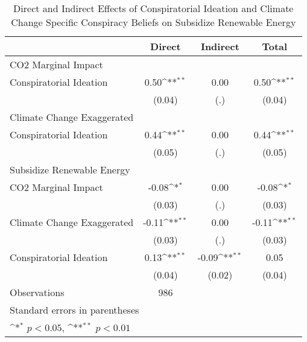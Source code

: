 \begin{table}[htbp]\centering
\def\sym#1{\ifmmode^{#1}\else\(^{#1}\)\fi}
\caption{Direct and Indirect Effects of Conspiratorial Ideation and Climate Change Specific Conspiracy Beliefs on Subsidize Renewable Energy}
\begin{tabular}{l*{3}{c}}
\hline\hline
                    &\multicolumn{1}{c}{Direct}&\multicolumn{1}{c}{Indirect}&\multicolumn{1}{c}{Total}\\
\hline
CO2 Marginal Impact &                    &                    &                    \\
Conspiratorial Ideation&        0.50\sym{**}&        0.00        &        0.50\sym{**}\\
                    &      (0.04)        &         (.)        &      (0.04)        \\
\hline
Climate Change Exaggerated&                    &                    &                    \\
Conspiratorial Ideation&        0.44\sym{**}&        0.00        &        0.44\sym{**}\\
                    &      (0.05)        &         (.)        &      (0.05)        \\
\hline
Subsidize Renewable Energy&                    &                    &                    \\
CO2 Marginal Impact &       -0.08\sym{*} &        0.00        &       -0.08\sym{*} \\
                    &      (0.03)        &         (.)        &      (0.03)        \\
[1em]
Climate Change Exaggerated&       -0.11\sym{**}&        0.00        &       -0.11\sym{**}\\
                    &      (0.03)        &         (.)        &      (0.03)        \\
[1em]
Conspiratorial Ideation&        0.13\sym{**}&       -0.09\sym{**}&        0.05        \\
                    &      (0.04)        &      (0.02)        &      (0.04)        \\
\hline
Observations        &         986        &                    &                    \\
\hline\hline
\multicolumn{4}{l}{\footnotesize Standard errors in parentheses}\\
\multicolumn{4}{l}{\footnotesize \sym{*} \(p<0.05\), \sym{**} \(p<0.01\)}\\
\end{tabular}
\end{table}
